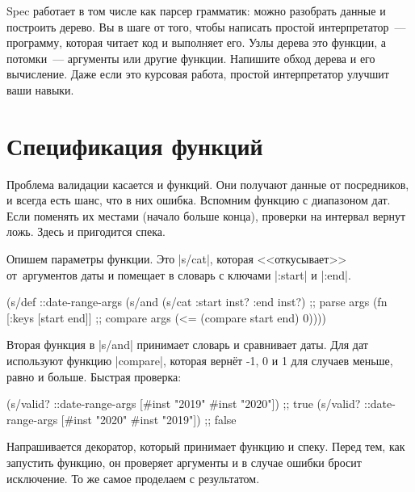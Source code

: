 
Spec работает в том числе как парсер грамматик: можно разобрать данные и
построить дерево. Вы в шаге от того, чтобы написать простой интерпретатор~---
программу, которая читает код и выполняет его. Узлы дерева это функции, а
потомки~--- аргументы или другие функции. Напишите обход дерева и его
вычисление. Даже если это курсовая работа, простой интерпретатор улучшит ваши
навыки.

\section{Спецификация функций}


Проблема валидации касается и функций. Они получают данные от посредников, и
всегда есть шанс, что в них ошибка. Вспомним функцию с диапазоном дат. Если
поменять их местами (начало больше конца), проверки на интервал вернут
ложь. Здесь и пригодится спека.

Опишем параметры функции. Это \spverb|s/cat|, которая <<откусывает>>
от~аргументов даты и помещает в словарь с ключами \spverb|:start| и
\spverb|:end|.

\begin{english}
  \begin{clojure}
(s/def ::date-range-args
  (s/and
   (s/cat :start inst? :end inst?) ;; parse args
   (fn [{:keys [start end]}]       ;; compare args
     (<= (compare start end) 0))))
  \end{clojure}
\end{english}


Вторая функция в \spverb|s/and| принимает словарь и сравнивает даты. Для дат
используют функцию \spverb|compare|, которая верн\"{е}т -1, 0 и 1 для случаев
меньше, равно и больше. Быстрая проверка:

\begin{english}
  \begin{clojure}
(s/valid? ::date-range-args [#inst "2019" #inst "2020"]) ;; true
(s/valid? ::date-range-args [#inst "2020" #inst "2019"]) ;; false
  \end{clojure}
\end{english}


Напрашивается декоратор, который принимает функцию и спеку. Перед тем, как
запустить функцию, он проверяет аргументы и в случае ошибки бросит исключение. То
же самое проделаем с результатом.

